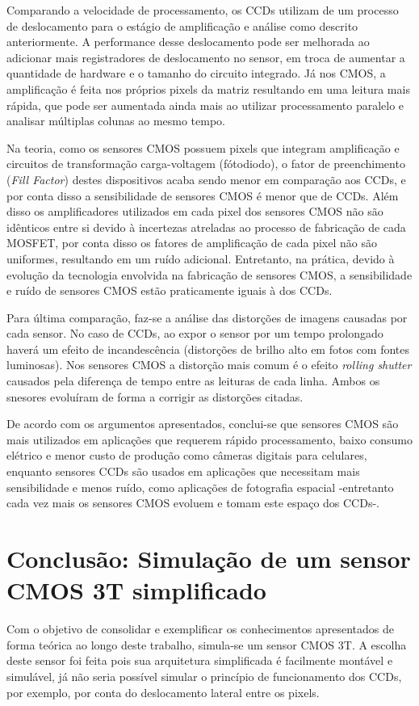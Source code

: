 \documentclass[10pt,a4paper,twocolumn]{article}
\begin{document}
	Comparando a velocidade de processamento, os CCDs utilizam de um processo de deslocamento para o estágio de amplificação e análise como descrito anteriormente. A performance desse deslocamento pode ser melhorada ao adicionar mais registradores de deslocamento no sensor, em troca de aumentar a quantidade de hardware e o tamanho do circuito integrado. Já nos CMOS, a amplificação é feita nos próprios pixels da matriz resultando em uma leitura mais rápida, que pode ser aumentada ainda mais ao utilizar processamento paralelo e analisar múltiplas colunas ao mesmo tempo.
	
	Na teoria, como os sensores CMOS possuem pixels que integram amplificação e circuitos de transformação carga-voltagem (fótodiodo), o fator de preenchimento (\textit{Fill Factor}) destes dispositivos acaba sendo menor em comparação aos CCDs, e por conta disso a sensibilidade de sensores CMOS é menor que de CCDs. Além disso os amplificadores utilizados em cada pixel dos sensores CMOS não são idênticos entre si devido à incertezas atreladas ao processo de fabricação de cada MOSFET, por conta disso os fatores de amplificação de cada pixel não são uniformes, resultando em um ruído adicional. Entretanto, na prática, devido à evolução da tecnologia envolvida na fabricação de sensores CMOS, a sensibilidade e ruído de sensores CMOS estão praticamente iguais à dos CCDs.
	
	Para última comparação, faz-se a análise das distorções de imagens causadas por cada sensor. No caso de CCDs, ao expor o sensor por um tempo prolongado haverá um efeito de incandescência (distorções de brilho alto em fotos com fontes luminosas). Nos sensores CMOS a distorção mais comum é o efeito \textit{rolling shutter} causados pela diferença de tempo entre as leituras de cada linha. Ambos os snesores evoluíram de forma a corrigir as distorções citadas.
	
	De acordo com os argumentos apresentados, conclui-se que sensores CMOS são mais utilizados em aplicações que requerem rápido processamento, baixo consumo elétrico e menor custo de produção como câmeras digitais para celulares, enquanto sensores CCDs são usados em aplicações que necessitam mais sensibilidade e menos ruído, como aplicações de fotografia espacial -entretanto cada vez mais os sensores CMOS evoluem e tomam este espaço dos CCDs-.
	
	\section*{Conclusão: Simulação de um sensor CMOS 3T simplificado}
	Com o objetivo de consolidar e exemplificar os conhecimentos apresentados de forma teórica ao longo deste trabalho, simula-se um sensor CMOS 3T. A escolha deste sensor foi feita pois sua arquitetura simplificada é facilmente montável e simulável, já não seria possível simular o princípio de funcionamento dos CCDs, por exemplo, por conta do deslocamento lateral entre os pixels.
	
\end{document}
